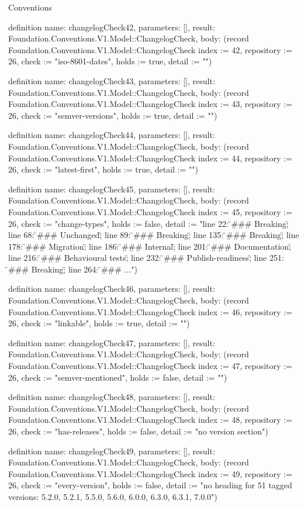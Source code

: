 \begin{lexlean}{Conventions}
\begin{semanticmodule}
definition{
  name: changelogCheck42,
  parameters: [],
  result: Foundation.Conventions.V1.Model::ChangelogCheck,
  body: (record Foundation.Conventions.V1.Model::ChangelogCheck {index := 42, repository := 26, check := "iso-8601-dates", holds := true, detail := ""})
}

definition{
  name: changelogCheck43,
  parameters: [],
  result: Foundation.Conventions.V1.Model::ChangelogCheck,
  body: (record Foundation.Conventions.V1.Model::ChangelogCheck {index := 43, repository := 26, check := "semver-versions", holds := true, detail := ""})
}

definition{
  name: changelogCheck44,
  parameters: [],
  result: Foundation.Conventions.V1.Model::ChangelogCheck,
  body: (record Foundation.Conventions.V1.Model::ChangelogCheck {index := 44, repository := 26, check := "latest-first", holds := true, detail := ""})
}

definition{
  name: changelogCheck45,
  parameters: [],
  result: Foundation.Conventions.V1.Model::ChangelogCheck,
  body: (record Foundation.Conventions.V1.Model::ChangelogCheck {index := 45, repository := 26, check := "change-types", holds := false, detail := "line 22: \"### Breaking\"; line 68: \"### Unchanged\"; line 89: \"### Breaking\"; line 135: \"### Breaking\"; line 178: \"### Migration\"; line 186: \"### Internal\"; line 201: \"### Documentation\"; line 216: \"### Behavioural tests\"; line 232: \"### Publish-readiness\"; line 251: \"### Breaking\"; line 264: \"### ..."})
}

definition{
  name: changelogCheck46,
  parameters: [],
  result: Foundation.Conventions.V1.Model::ChangelogCheck,
  body: (record Foundation.Conventions.V1.Model::ChangelogCheck {index := 46, repository := 26, check := "linkable", holds := true, detail := ""})
}

definition{
  name: changelogCheck47,
  parameters: [],
  result: Foundation.Conventions.V1.Model::ChangelogCheck,
  body: (record Foundation.Conventions.V1.Model::ChangelogCheck {index := 47, repository := 26, check := "semver-mentioned", holds := false, detail := ""})
}

definition{
  name: changelogCheck48,
  parameters: [],
  result: Foundation.Conventions.V1.Model::ChangelogCheck,
  body: (record Foundation.Conventions.V1.Model::ChangelogCheck {index := 48, repository := 26, check := "has-releases", holds := false, detail := "no version section"})
}

definition{
  name: changelogCheck49,
  parameters: [],
  result: Foundation.Conventions.V1.Model::ChangelogCheck,
  body: (record Foundation.Conventions.V1.Model::ChangelogCheck {index := 49, repository := 26, check := "every-version", holds := false, detail := "no heading for 51 tagged versions: 5.2.0, 5.2.1, 5.5.0, 5.6.0, 6.0.0, 6.3.0, 6.3.1, 7.0.0"})
}


\end{semanticmodule}
\end{lexlean}
